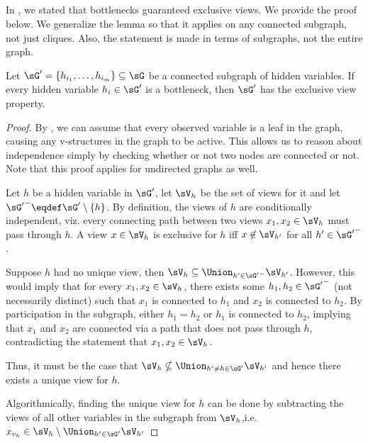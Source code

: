 \subsection{}
\label{app:exclusive-views}

In , we stated that bottlenecks guaranteed
  exclusive views. We provide the proof below.
  We generalize the lemma so that it applies
  on any connected subgraph, not just cliques.
  Also, the statement is made in terms of subgraphs,
  not the entire graph.

\begin{lemma*}
Let $\sG' = \{ h_{i_1}, \ldots, h_{i_m} \} \subseteq \sG$ be
  a connected subgraph of hidden variables. If every hidden variable
  $h_i \in \sG'$ is a bottleneck, then $\sG'$ has the exclusive view property.
\end{lemma*}

\begin{proof}
  By , we can assume that every observed
  variable is a leaf in the graph, causing any v-structures in the graph
  to be active. This allows us to reason about independence simply by
  checking whether or not two nodes are connected or not.
  Note that this proof applies for undirected graphs as well.

  Let $h$ be a hidden variable in $\sG'$, let $\sV_{h}$ be the set of
  views for it and let ${\sG'}^- \eqdef \sG' \setminus \{h\}$.
  By definition, the views of $h$ are conditionally independent, viz.
    every connecting path between two views $x_1, x_2 \in \sV_h$ must pass through
    $h$.
  A view $x \in \sV_{h}$ is exclusive for $h$ iff $x \not\in \sV_{h'}$ for all $h'
  \in {\sG'}^-$.

  Suppose $h$ had no unique view, then $\sV_{h} \subseteq \Union_{h' \in {\sG'}^-} \sV_{h'}$. 
  However, this would imply that for every $x_1, x_2 \in \sV_{h}$, there
  exists some $h_1, h_2 \in {\sG'}^-$ (not necessarily distinct) such that
    $x_1$ is connected to $h_1$ and $x_2$ is connected to $h_2$.
  By participation in the subgraph, either $h_1 = h_2$ or $h_1$ is
    connected to $h_2$, implying that $x_1$ and $x_2$ are connected
    via a path that does not pass through $h$, contradicting the
    statement that $x_1, x_2 \in \sV_h$. 
    
  Thus, it must be the case that $\sV_{h} \nsubseteq \Union_{h' \neq
    h \in \sG'} \sV_{h'}$ and hence there exists a unique view for $h$.

  Algorithmically, finding the unique view for $h$ can be done by
  subtracting the views of all other variables in the subgraph from
  $\sV_h$,i.e. $x_{v_h} \in \sV_h \setminus \Union_{h' \in \sG'} \sV_{h'}$
\end{proof}

